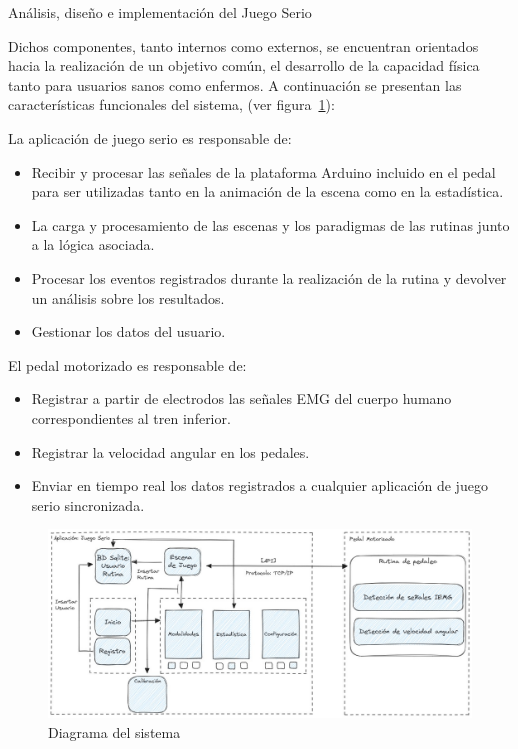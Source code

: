 \begin{thesischapter}{2} {Análisis, diseño e implementación del Juego Serio}
    
    Dichos componentes, tanto internos como externos, se encuentran orientados hacia 
    la realización de un objetivo común, el desarrollo de la capacidad física tanto para usuarios 
    sanos como enfermos. A continuación se presentan las características funcionales 
    del sistema, (ver figura~\ref{fig: system}):

    \vspace{10pt}
    La aplicación de juego serio es responsable de:
    \begin{itemize}
        \item Recibir y procesar las señales de la plataforma Arduino incluido en el pedal para ser utilizadas tanto en la 
              animación de la escena como en la estadística.
        \item La carga y procesamiento de las escenas y los paradigmas de las rutinas junto a la lógica asociada. 
        \item Procesar los eventos registrados durante la realización de la rutina y devolver un análisis sobre los resultados.
        \item Gestionar los datos del usuario.
    \end{itemize}

    \vspace{10pt}
    El pedal motorizado es responsable de:
    \begin{itemize}
        \item Registrar a partir de electrodos las señales EMG del cuerpo humano correspondientes al tren inferior.
        \item Registrar la velocidad angular en los pedales.
        \item Enviar en tiempo real los datos registrados a cualquier aplicación de juego serio sincronizada.
    \end{itemize}
    
    \begin{figure}[ht]
        \centering
        \includegraphics[scale=0.38]{images/system.jpg}
        \caption{Diagrama del sistema}
        \label{fig: system}
    \end{figure} 
    

\end{thesischapter}
